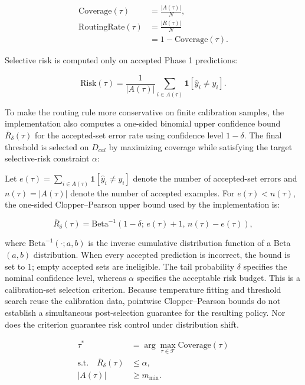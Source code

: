 \documentclass{ieeeaccess}
\begin{document}
\begin{align}
\mathrm{Coverage}(\tau) &= \frac{|A(\tau)|}{N}, \\
\mathrm{RoutingRate}(\tau) &= \frac{|R(\tau)|}{N} \\
&= 1-\mathrm{Coverage}(\tau).
\end{align}

Selective risk is computed only on accepted Phase 1 predictions:

\begin{equation}
\mathrm{Risk}(\tau)=
\frac{1}{|A(\tau)|}
\sum_{i \in A(\tau)}
\mathbf{1}[\hat{y}_i \ne y_i].
\end{equation}

To make the routing rule more conservative on finite calibration samples, the implementation also computes a one-sided binomial upper confidence bound $\overline{R}_{\delta}(\tau)$ for the accepted-set error rate using confidence level $1-\delta$. The final threshold is selected on $D_{cal}$ by maximizing coverage while satisfying the target selective-risk constraint $\alpha$:

Let $e(\tau)=\sum_{i\in A(\tau)}\mathbf{1}[\hat{y}_i\ne y_i]$ denote the number of accepted-set errors and $n(\tau)=|A(\tau)|$ denote the number of accepted examples. For $e(\tau)<n(\tau)$, the one-sided Clopper--Pearson upper bound used by the implementation is:

\begin{equation}
\overline{R}_{\delta}(\tau)=
\mathrm{Beta}^{-1}\!\left(
1-\delta;\,
e(\tau)+1,\,
n(\tau)-e(\tau)
\right),
\label{eq:clopper-pearson-bound}
\end{equation}

where $\mathrm{Beta}^{-1}(\cdot;a,b)$ is the inverse cumulative distribution function of a Beta$(a,b)$ distribution. When every accepted prediction is incorrect, the bound is set to 1; empty accepted sets are ineligible. The tail probability $\delta$ specifies the nominal confidence level, whereas $\alpha$ specifies the acceptable risk budget. This is a calibration-set selection criterion. Because temperature fitting and threshold search reuse the calibration data, pointwise Clopper--Pearson bounds do not establish a simultaneous post-selection guarantee for the resulting policy. Nor does the criterion guarantee risk control under distribution shift.

\begin{align}
\tau^* &= \arg\max_{\tau \in \mathcal{T}}
\mathrm{Coverage}(\tau) \\
\text{s.t.}\quad
\overline{R}_{\delta}(\tau) &\leq \alpha, \\
|A(\tau)| &\geq m_{\min}.
\end{align}
\end{document}
